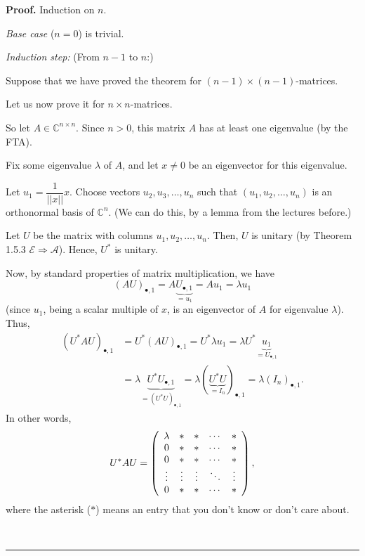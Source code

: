 \documentclass[numbers=enddot,12pt,final,onecolumn,notitlepage]{scrartcl}%
\numberwithin{exer}{subsection}
\theoremstyle{definition}
\newenvironment{proof}[1][Proof]{\noindent\textbf{#1.} }{\ \rule{0.5em}{0.5em}}
\begin{document}
\begin{proof}
Induction on $n$.

\textit{Base case} ($n=0$) is trivial.

\textit{Induction step:} (From $n-1$ to $n$:)

Suppose that we have proved the theorem for $\left(  n-1\right)  \times\left(
n-1\right)  $-matrices.

Let us now prove it for $n\times n$-matrices.

So let $A\in\mathbb{C}^{n\times n}$. Since $n>0$, this matrix $A$ has at least
one eigenvalue (by the FTA).

Fix some eigenvalue $\lambda$ of $A$, and let $x\neq0$ be an eigenvector for
this eigenvalue.

Let $u_{1}=\dfrac{1}{\left\vert \left\vert x\right\vert \right\vert }x$.
Choose vectors $u_{2},u_{3},\ldots,u_{n}$ such that $\left(  u_{1}%
,u_{2},\ldots,u_{n}\right)  $ is an orthonormal basis of $\mathbb{C}^{n}$. (We
can do this, by a lemma from the lectures before.)

Let $U$ be the matrix with columns $u_{1},u_{2},\ldots,u_{n}$. Then, $U$ is
unitary (by Theorem 1.5.3 $\mathcal{E}\Longrightarrow\mathcal{A}$). Hence,
$U^{\ast}$ is unitary.

Now, by standard properties of matrix multiplication, we have%
\[
\left(  AU\right)  _{\bullet,1}=A\underbrace{U_{\bullet,1}}_{=u_{1}}%
=Au_{1}=\lambda u_{1}%
\]
(since $u_{1}$, being a scalar multiple of $x$, is an eigenvector of $A$ for
eigenvalue $\lambda$). Thus,%
\begin{align*}
\left(  U^{\ast}AU\right)  _{\bullet,1}  & =U^{\ast}\left(  AU\right)
_{\bullet,1}=U^{\ast}\lambda u_{1}=\lambda U^{\ast}\underbrace{u_{1}%
}_{=U_{\bullet,1}}\\
& =\lambda\underbrace{U^{\ast}U_{\bullet,1}}_{=\left(  U^{\ast}U\right)
_{\bullet,1}}=\lambda\left(  \underbrace{U^{\ast}U}_{=I_{n}}\right)
_{\bullet,1}=\lambda\left(  I_{n}\right)  _{\bullet,1}.
\end{align*}
In other words,%
\[
U^{\ast}AU=\left(
\begin{array}
[c]{ccccc}%
\lambda & \ast & \ast & \cdots & \ast\\
0 & \ast & \ast & \cdots & \ast\\
0 & \ast & \ast & \cdots & \ast\\
\vdots & \vdots & \vdots & \ddots & \vdots\\
0 & \ast & \ast & \cdots & \ast
\end{array}
\right)  ,
\]
where the asterisk ($\ast$) means an entry that you don't know or don't care about.


\end{proof}
\end{document}
